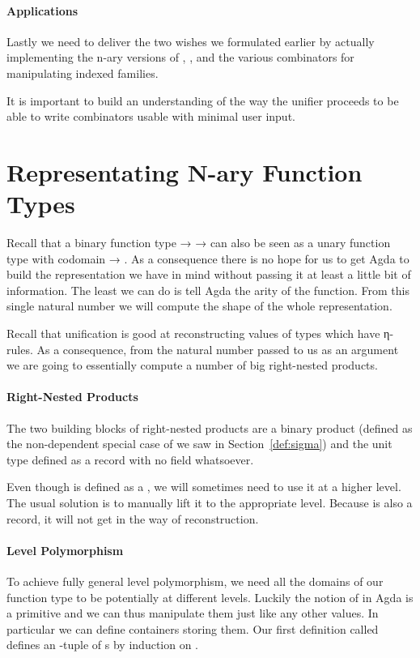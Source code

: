 \paragraph{Applications} Lastly we need to deliver the two wishes we
formulated earlier by actually implementing the n-ary versions of ,
, and the various combinators for manipulating indexed families.


It is important to build an understanding of the way the unifier proceeds
to be able to write combinators usable with minimal user input.


\section{Representating N-ary Function Types}\label{sec:naryfunction}

Recall that a binary function type { →  → } can also be seen
as a unary function type with codomain { → }. As a consequence there
is no hope for us to get Agda to build the representation we have in mind without
passing it at least a little bit of information. The least we can do is tell Agda
the arity of the function. From this single natural number we will compute the
shape of the whole representation.

Recall that unification is good at reconstructing values of types which have
η-rules. As a consequence, from the natural number  passed to us as an
argument we are going to essentially compute a number of big right-nested
products.

\paragraph{Right-Nested Products} The two building blocks of right-nested
products are a binary product  (defined as the non-dependent special
case of  we saw in Section~\ref{def:sigma}) and the unit type
 defined as a record with no field whatsoever.


Even though  is defined as a , we will sometimes need to use
it at a higher level. The usual solution is to manually lift it to the
appropriate level. Because  is also a record, it will not get in the
way of reconstruction.


\paragraph{Level Polymorphism} To achieve fully general level polymorphism, we
need all the domains of our function type to be potentially at different levels.
Luckily the notion of  in Agda is a primitive  and we can thus
manipulate them just like any other values. In particular we can define containers
storing them. Our first definition called  defines an -tuple of
s by induction on .

